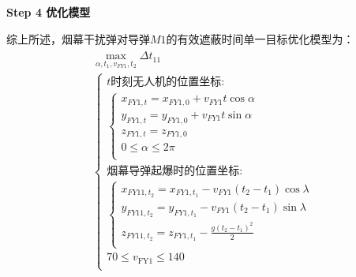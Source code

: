 \documentclass[../main.tex]{subfiles}
\begin{document}
\textbf{Step 4 优化模型}
\par 综上所述，烟幕干扰弹对导弹$M1$的有效遮蔽时间单一目标优化模型为：
\begin{align}
  \begin{array}{c}
	\underset{\alpha ,t_1,v_{FY1},t_2}{\max}\Delta t_{11}
  \\
\left\{ \begin{array}{l}
	t\text{时刻无人机的位置坐标:}\\
	\left\{ \begin{array}{l}
	x_{FY1,t}=x_{FY1,0}+v_{FY1}t\cos \alpha \\
	y_{FY1,t}=y_{FY1,0}+v_{FY1}t\sin \alpha \\
	z_{FY1,t}=z_{FY1,0}\\
	0\leq \alpha \leq 2\pi \\
\end{array} \right.\\
	\text{烟幕导弹起爆时的位置坐标:}\\
	\left\{ \begin{array}{l}
	x_{FY11,t_2}=x_{FY1,t_1}-v_{FY1}\left( t_2-t_1 \right) \cos \lambda\\
	y_{FY11,t_2}=y_{FY1,t_1}-v_{FY1}\left( t_2-t_1 \right) \sin \lambda\\
	z_{FY11,t_2}=z_{FY1,t_1}-\frac{g\left( t_2-t_1 \right) ^2}{2}\\
\end{array} \right.\\
  70 \leq v_{\text{FY1}} \leq 140\\
\end{array} \right.  
\end{array}
\end{align}










  
\end{document}
